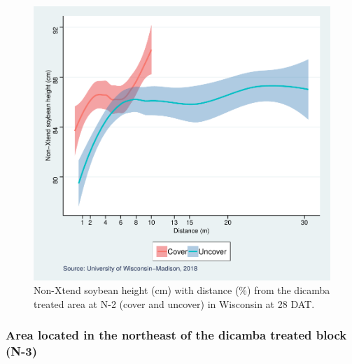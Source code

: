 \documentclass[]{article}
\begin{document}
\begin{figure}
\centering
\includegraphics{Report_Dicamba_study_files/figure-latex/unnamed-chunk-105-1.pdf}
\caption{Non-Xtend soybean height (cm) with distance (\%) from the
dicamba treated area at N-2 (cover and uncover) in Wisconsin at 28 DAT.}
\end{figure}

\pagebreak
\newpage

\subsubsection{Area located in the northeast of the dicamba treated
block
(N-3)}\label{area-located-in-the-northeast-of-the-dicamba-treated-block-n-3-1}
\end{document}
